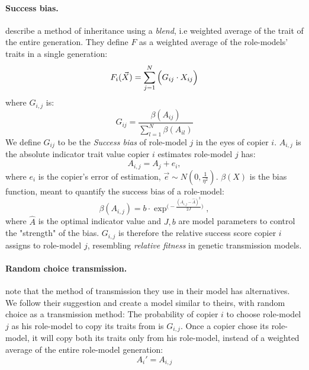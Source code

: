 \documentclass[11pt]{article}
\begin{document}
\paragraph{Success bias.} \citet[Ch.8, p.247-249]{evolutionBook} describe a method of inheritance using a \textit{blend}, i.e weighted average of the trait of the entire generation. They define $F$ as a weighted average  of the role-models' traits in a single generation:
\begin{equation}
F_i(\vec{X}) = \sum_{j=1}^N \Big(G_{ij}\cdot X_{ij}\Big) \\\\
\end{equation}
where $G_{i,j}$ is: 
\begin{equation}
G_{ij} = \frac{\beta(A_{ij})}{\sum_{l=1}^{N} \beta(A_{il})}
\end{equation}
We define $G_{ij}$ to be the \textit{Success bias} of role-model $j$ in the eyes of copier $i$.
$A_{i,j}$ is the absolute indicator trait value copier $i$ estimates role-model $j$ has:
\begin{equation}\label{eq:relativeIndicator}
A_{i,j} = A_j + e_i,
\end{equation}
where $e_i$ is the copier's error of estimation, $\vec{e} \sim N(0,\frac{1}{\eta^2})$.
$\beta(X)$ is the bias function, meant to quantify the success bias of a role-model:
\begin{equation}\label{eq:success_bias}
\beta(A_{i,j}) = b \cdot \exp^{\Big(-\frac{(A_{i,j} - \hat{A})^2}{2J}\Big)},
\end{equation} 
where $\hat{A}$ is the optimal indicator value and $J,b$ are model parameters to control the "strength" of the bias.
$G_{i,j}$ is therefore the relative success score copier $i$ assigns to role-model $j$, resembling \textit{relative fitness} in genetic transmission models.

\paragraph{Random choice transmission.}
\citet{evolutionBook} note that the method of transmission they use in their model has alternatives. We follow their suggestion and create a model similar to theirs, with random choice as a transmission method: The probability of copier $i$ to choose role-model $j$ as his role-model to copy its traits from is $G_{i,j}$.
Once a copier chose its role-model, it will copy both its traits only from his role-model, instead of a weighted average of the entire role-model generation:
\begin{equation}
A_i' = A_{i,j}
\end{equation}
\end{document}
